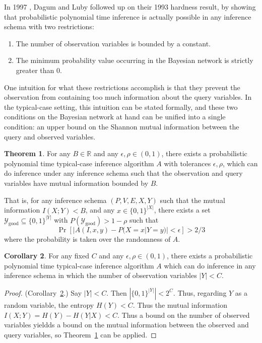 \documentclass{article}
\def \Ygood{\mathcal{Y}_\text{good}}
\theoremstyle{definition}
\newtheorem{thm}{Theorem}
\newtheorem{cor}[thm]{Corollary}
\theoremstyle{remark}
\begin{document}
\bigskip
\noindent In 1997 \cite{dagum1997optimal}, Dagum and Luby followed up on their 1993 hardness result, by showing that probabilistic polynomial time inference is actually possible in any inference schema with two restrictions:
\begin{enumerate}
    \item The number of observation variables is bounded by a constant.
    \item The minimum probability value occurring in the Bayesian network is strictly greater than $0$.
\end{enumerate}
One intuition for what these restrictions accomplish is that they prevent the observation from containing too much information about the query variables.
In the typical-case setting, this intuition can be stated formally, and these two conditions on the Bayesian network at hand can be unified into a single condition: an upper bound on the Shannon mutual information between the query and observed variables.

\begin{thm} \label{thm:bounded_mutual_info}
For any $B \in \mathbb{R}$ and any $\epsilon, \rho \in (0, 1)$,
there exists a probabilistic polynomial time typical-case inference algorithm $A$
with tolerances $\epsilon, \rho$, which can do inference under any inference schema such that the observation and query variables have mutual information bounded by $B$.

\smallskip
\noindent That is, for any
inference schema $(P, V, E, X, Y)$ such that the mutual information $I(X; Y) < B$, and any $x \in \{0, 1\}^{|X|}$, there exists a set $\Ygood \subseteq \{0, 1\}^{|Y|}$ with $P(\Ygood) > 1 - \rho$ such that
$$
\Pr[|A(I, x, y) - P(X = x | Y = y)| < \epsilon] > 2/3
$$
where the probability is taken over the randomness of $A$.
\end{thm}
\begin{cor} \label{cor:small_obs_set}
For any fixed $C$ and any $\epsilon, \rho \in (0, 1)$,
there exists a probabilistic polynomial time typical-case inference algorithm $A$
which can do inference in any inference schema in which the number of observation variables $|Y| < C$.
\end{cor}
\begin{proof}{(Corollary~\ref{cor:small_obs_set}.)}
Say $|Y| < C$.  Then $|\{{0, 1}\}^{|Y|}| < 2^C$.
Thus, regarding $Y$ as a random variable, the entropy $H(Y) < C$.
Thus the mutual information $I(X ; Y) = H(Y) - H(Y | X) < C$.
Thus a bound on the number of observed variables yieldds a bound on the mutual information between the observed and query variables, so Theorem~\ref{thm:bounded_mutual_info} can be applied.
\end{proof}
\end{document}
